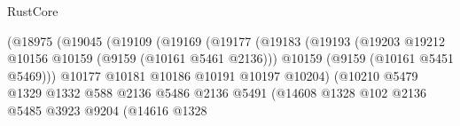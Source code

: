 \begin{lexlean}{RustCore}
\begin{coremodule}
                                                  (@18975
                                                    (@19045
                                                      (@19109
                                                        (@19169
                                                          (@19177
                                                            (@19183
                                                              (@19193
                                                                (@19203
                                                                  @19212
                                                                  @10156
                                                                  @10159
                                                                  (@9159 (@10161 @5461 @2136)))
                                                                @10159
                                                                (@9159 (@10161 @5451 @5469)))
                                                              @10177
                                                              @10181
                                                              @10186
                                                              @10191
                                                              @10197
                                                              @10204)
                                                            (@10210
                                                              @5479
                                                              @1329
                                                              @1332
                                                              @588
                                                              @2136
                                                              @5486
                                                              @2136
                                                              @5491
                                                              (@14608
                                                                @1328
                                                                @102
                                                                @2136
                                                                @5485
                                                                @3923
                                                                @9204
                                                                (@14616
                                                                  @1328

\end{coremodule}
\end{lexlean}
